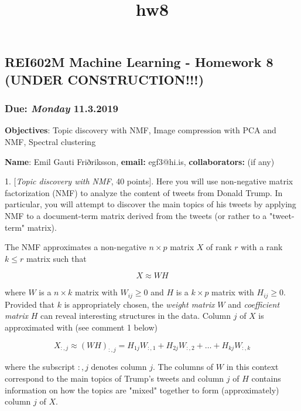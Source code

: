 \documentclass[11pt]{article}
\title{hw8}
\begin{document}
    
    
    \maketitle
    
    

    
    \subsection{\texorpdfstring{REI602M Machine Learning - Homework 8
(\textbf{UNDER
CONSTRUCTION!!!})}{REI602M Machine Learning - Homework 8 (UNDER CONSTRUCTION!!!)}}\label{rei602m-machine-learning---homework-8-under-construction}

\subsubsection{\texorpdfstring{Due: \emph{Monday}
11.3.2019}{Due: Monday 11.3.2019}}\label{due-monday-11.3.2019}

\textbf{Objectives}: Topic discovery with NMF, Image compression with
PCA and NMF, Spectral clustering

\textbf{Name}: Emil Gauti Friðriksson, \textbf{email: } egf3@hi.is,
\textbf{collaborators:} (if any)

    1. {[}\emph{Topic discovery with NMF}, 40 points{]}. Here you will use
non-negative matrix factorization (NMF) to analyze the content of tweets
from Donald Trump. In particular, you will attempt to discover the main
topics of his tweets by applying NMF to a document-term matrix derived
from the tweets (or rather to a "tweet-term" matrix).

The NMF approximates a non-negative \(n \times p\) matrix \(X\) of rank
\(r\) with a rank \(k \leq r\) matrix such that

\[
X \approx WH
\]

where \(W\) is a \(n \times k\) matrix with \(W_{ij} \geq 0\) and \(H\)
is a \(k \times p\) matrix with \(H_{ij} \geq 0\). Provided that \(k\)
is appropriately chosen, the \emph{weight matrix} \(W\) and
\emph{coefficient matrix} \(H\) can reveal interesting structures in the
data. Column \(j\) of \(X\) is approximated with (see comment 1 below)

\[
X_{:,j} \approx (WH)_{:,j} = H_{1j}W_{:,1} + H_{2j}W_{:,2} + \ldots + H_{kj}W_{:,k}
\]

where the subscript \(:,j\) denotes column \(j\). The columns of \(W\)
in this context correspond to the main topics of Trump's tweets and
column \(j\) of \(H\) contains information on how the topics are "mixed"
together to form (approximately) column \(j\) of \(X\).
\end{document}
